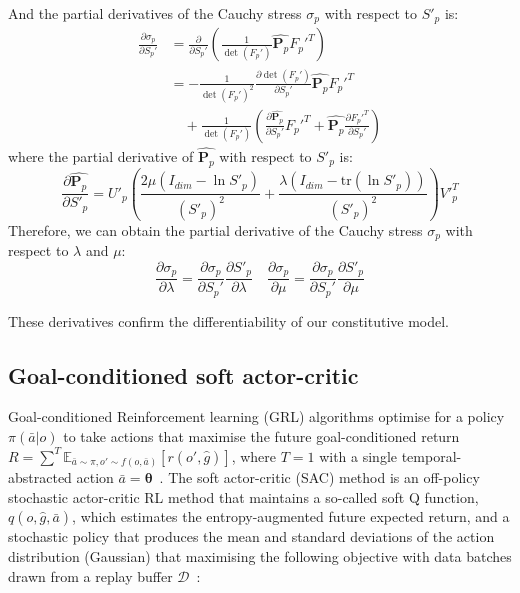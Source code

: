 \documentclass[letterpaper, 10 pt, journal, twoside]{ieeetran}
\begin{document}
And the partial derivatives of the Cauchy stress $\sigma_p$ with respect to $S'_p$ is:
\begin{align}
\frac{\partial \sigma_p}{\partial S_p'} &=
\frac{\partial}{\partial S_p'} \left( \frac{1}{\det(F_p')} \hat{\bm{P}_{p}} F_p'^{T} \right) \nonumber \\
&=
- \frac{1}{\det(F_p')^2} 
\frac{\partial \det(F_p')}{\partial S_p'} \hat{\bm{P}_{p}} F_p'^{T} \nonumber \\
&\quad + \frac{1}{\det(F_p')} \left(
\frac{\partial \hat{\bm{P}_{p}}}{\partial S_p'} F_p'^{T}
+ \hat{\bm{P}_{p}} \frac{\partial F_p'^{T}}{\partial S_p'}
\right)
\end{align}
where the partial derivative of $\hat{\bm{P}_{p}}$ with respect to $S'_p$ is:
\begin{equation}
\frac{\partial \hat{\bm{P}_{p}}}{\partial S'_p} = U'_p  \left(\frac{2 \mu (I_{dim} - \ln S'_p)}{(S'_p)^{2}} +  \frac{\lambda (I_{dim} - \mathrm{tr}(\ln S'_p))}{(S'_p)^{2}} \right) V'^{T}_p
\end{equation}
Therefore, we can obtain the partial derivative of 
the Cauchy stress $\sigma_p$ with respect to $\lambda$ and $\mu$:
\begin{equation}
\frac{\partial \sigma_p}{\partial \lambda} = \frac{\partial \sigma_p}{\partial S_p'} \frac{\partial S'_p}{\partial \lambda} \quad \frac{\partial \sigma_p}{\partial \mu} = \frac{\partial \sigma_p}{\partial S_p'} \frac{\partial S'_p}{\partial \mu}
\end{equation}

These derivatives confirm the differentiability of our constitutive model.

\subsection{Goal-conditioned soft actor-critic}
Goal-conditioned Reinforcement learning (GRL) algorithms optimise for a policy $\pi(\bar{a}|o)$ to take actions that maximise the future goal-conditioned return $R=\sum^T\mathbb{E}_{\bar{a}\sim\pi,o'\sim f(o,\bar{a})}[r(o',\hat{g})]$, where $T=1$ with a single temporal-abstracted action $\bar{a}=\pmb{\theta}$~\cite{sutton2018reinforcement,andrychowicz2017hindsight}. The soft actor-critic (SAC) method is an off-policy stochastic actor-critic RL method that maintains a so-called soft Q function, $q(o, \hat{g}, \bar{a})$, which estimates the entropy-augmented future expected return, and a stochastic policy that produces the mean and standard deviations of the action distribution (Gaussian) that maximising the following objective with data batches drawn from a replay buffer $\mathcal{D}$~\cite{haarnoja2018soft}: 
\end{document}
